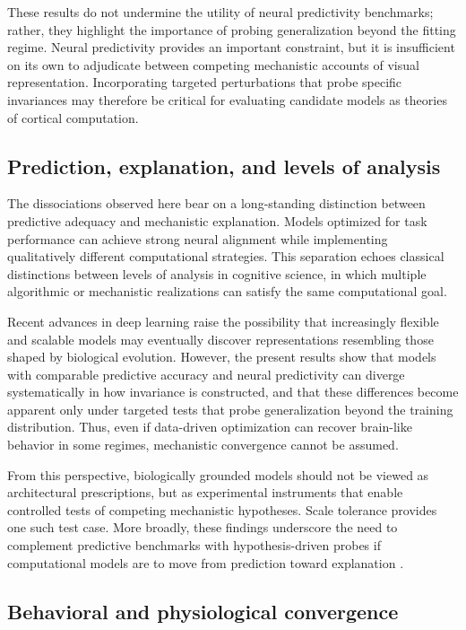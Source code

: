 \documentclass[pdflatex,sn-nature]{sn-jnl}
\begin{document}
These results do not undermine the utility of neural predictivity benchmarks; rather, they highlight the importance of probing generalization beyond the fitting regime. Neural predictivity provides an important constraint, but it is insufficient on its own to adjudicate between competing mechanistic accounts of visual representation. Incorporating targeted perturbations that probe specific invariances may therefore be critical for evaluating candidate models as theories of cortical computation.

\subsection{Prediction, explanation, and levels of analysis}

The dissociations observed here bear on a long-standing distinction between predictive adequacy and mechanistic explanation. Models optimized for task performance can achieve strong neural alignment while implementing qualitatively different computational strategies. This separation echoes classical distinctions between levels of analysis in cognitive science, in which multiple algorithmic or mechanistic realizations can satisfy the same computational goal.

Recent advances in deep learning raise the possibility that increasingly flexible and scalable models may eventually discover representations resembling those shaped by biological evolution. However, the present results show that models with comparable predictive accuracy and neural predictivity can diverge systematically in how invariance is constructed, and that these differences become apparent only under targeted tests that probe generalization beyond the training distribution. Thus, even if data-driven optimization can recover brain-like behavior in some regimes, mechanistic convergence cannot be assumed.

From this perspective, biologically grounded models should not be viewed as architectural prescriptions, but as experimental instruments that enable controlled tests of competing mechanistic hypotheses. Scale tolerance provides one such test case. More broadly, these findings underscore the need to complement predictive benchmarks with hypothesis-driven probes if computational models are to move from prediction toward explanation \citep{SerrePavlickNeuron2025}.

\subsection{Behavioral and physiological convergence}
\end{document}
